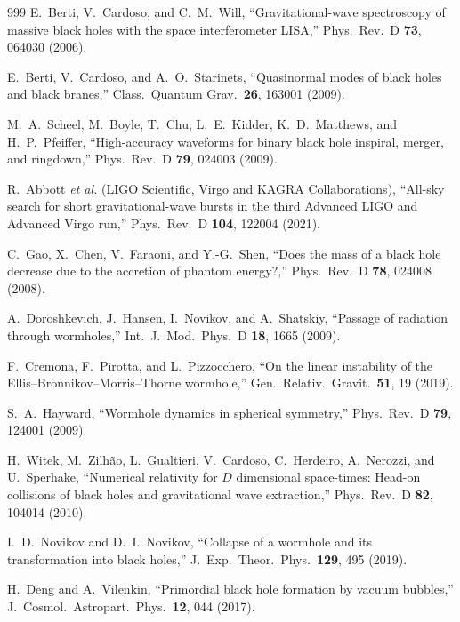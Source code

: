 \documentclass[twocolumn,floatfix,aps,prd,superscriptaddress,nofootinbib]{revtex4-2}
\begin{document}
\begin{thebibliography}{999}
E.~Berti, V.~Cardoso, and C.~M.~Will,
\newblock ``Gravitational-wave spectroscopy of massive black holes with the space interferometer LISA,''
\newblock Phys.\ Rev.\ D \textbf{73}, 064030 (2006).

E.~Berti, V.~Cardoso, and A.~O.~Starinets,
\newblock ``Quasinormal modes of black holes and black branes,''
\newblock Class.\ Quantum Grav.\ \textbf{26}, 163001 (2009).

M.~A.~Scheel, M.~Boyle, T.~Chu, L.~E.~Kidder, K.~D.~Matthews, and H.~P.~Pfeiffer,
\newblock ``High-accuracy waveforms for binary black hole inspiral, merger, and ringdown,''
\newblock Phys.\ Rev.\ D \textbf{79}, 024003 (2009).

R.~Abbott \emph{et al.} (LIGO Scientific, Virgo and KAGRA Collaborations),
\newblock ``All-sky search for short gravitational-wave bursts in the third Advanced LIGO and Advanced Virgo run,''
\newblock Phys.\ Rev.\ D \textbf{104}, 122004 (2021).

C.~Gao, X.~Chen, V.~Faraoni, and Y.-G.~Shen,
\newblock ``Does the mass of a black hole decrease due to the accretion of phantom energy?,''
\newblock Phys.\ Rev.\ D \textbf{78}, 024008 (2008).

A.~Doroshkevich, J.~Hansen, I.~Novikov, and A.~Shatskiy,
\newblock ``Passage of radiation through wormholes,''
\newblock Int.\ J.\ Mod.\ Phys.\ D \textbf{18}, 1665 (2009).

F.~Cremona, F.~Pirotta, and L.~Pizzocchero,
\newblock ``On the linear instability of the Ellis--Bronnikov--Morris--Thorne wormhole,''
\newblock Gen.\ Relativ.\ Gravit.\ \textbf{51}, 19 (2019).

S.~A.~Hayward,
\newblock ``Wormhole dynamics in spherical symmetry,''
\newblock Phys.\ Rev.\ D \textbf{79}, 124001 (2009).

H.~Witek, M.~Zilh\~ao, L.~Gualtieri, V.~Cardoso, C.~Herdeiro, A.~Nerozzi, and U.~Sperhake,
\newblock ``Numerical relativity for $D$ dimensional space-times: Head-on collisions of black holes and gravitational wave extraction,''
\newblock Phys.\ Rev.\ D \textbf{82}, 104014 (2010).

I.~D.~Novikov and D.~I.~Novikov,
\newblock ``Collapse of a wormhole and its transformation into black holes,''
\newblock J.\ Exp.\ Theor.\ Phys.\ \textbf{129}, 495 (2019).

H.~Deng and A.~Vilenkin,
\newblock ``Primordial black hole formation by vacuum bubbles,''
\newblock J.\ Cosmol.\ Astropart.\ Phys.\ \textbf{12}, 044 (2017).


\end{thebibliography}
\end{document}
